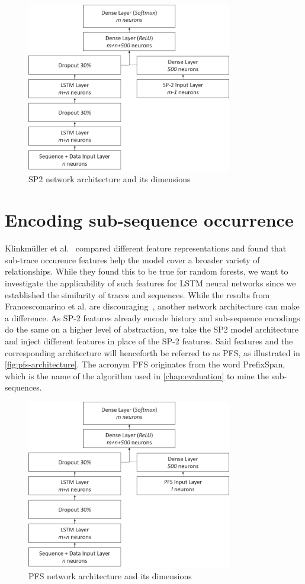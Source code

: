 \begin{figure}[ht]
    \centering
    \includegraphics[width=0.8\textwidth]{gfx/sp2-network-architecture.png}
    \caption{SP2 network architecture and its dimensions}
    \label{fig:sp2-architecture}
\end{figure}

\section{Encoding sub-sequence occurrence}
\label{sec:contrib:pfs-inspiration}
Klinkmüller et al.~\cite{klinkmuller2018reliablemonitoring} compared different feature representations and found that sub-trace occurence features help the model cover a broader variety of relationships. While they found this to be true for random forests, we want to investigate the applicability of such features for LSTM neural networks since we established the similarity of traces and sequences. While the results from Francescomarino et al. are discouraging~\cite{francescomarino2017}, another network architecture can make a difference. As SP-2 features already encode history and sub-sequence encodings do the same on a higher level of abstraction, we take the SP2 model architecture and inject different features in place of the SP-2 features. Said features and the corresponding architecture will henceforth be referred to as PFS, as illustrated in \autoref{fig:pfs-architecture}. The acronym PFS originates from the word PrefixSpan, which is the name of the algorithm used in \autoref{chap:evaluation} to mine the sub-sequences.

\begin{figure}[ht]
    \centering
    \includegraphics[width=0.8\textwidth]{gfx/pfs-network-architecture.png}
    \caption{PFS network architecture and its dimensions}
    \label{fig:pfs-architecture}
\end{figure}
